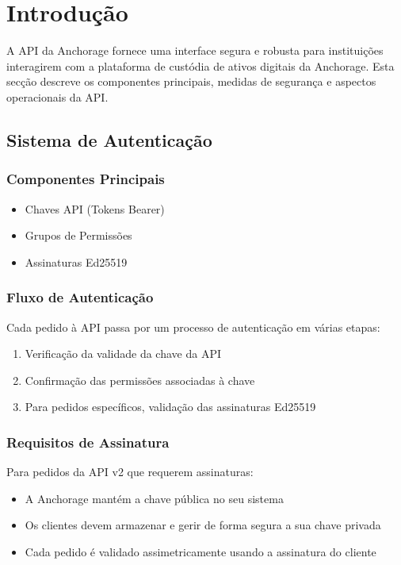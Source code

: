 \newpage
\thispagestyle{otherpages}
\section{Introdução}
A API da Anchorage fornece uma interface segura e robusta para instituições interagirem com a plataforma de custódia de ativos digitais da Anchorage. Esta secção descreve os componentes principais, medidas de segurança e aspectos operacionais da API.

\subsection{Sistema de Autenticação}
\subsubsection{Componentes Principais}
\begin{itemize}
\item Chaves API (Tokens Bearer)
\item Grupos de Permissões
\item Assinaturas Ed25519
\end{itemize}

\subsubsection{Fluxo de Autenticação}
Cada pedido à API passa por um processo de autenticação em várias etapas:
\begin{enumerate}
\item Verificação da validade da chave da API
\item Confirmação das permissões associadas à chave
\item Para pedidos específicos, validação das assinaturas Ed25519
\end{enumerate}

\subsubsection{Requisitos de Assinatura}
Para pedidos da API v2 que requerem assinaturas:
\begin{itemize}
\item A Anchorage mantém a chave pública no seu sistema
\item Os clientes devem armazenar e gerir de forma segura a sua chave privada
\item Cada pedido é validado assimetricamente usando a assinatura do cliente
\end{itemize}

